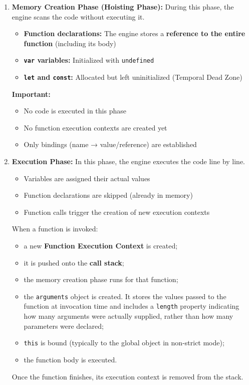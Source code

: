 \documentclass{scrbook}
\begin{document}
\begin{enumerate}
    \item
    \textbf{Memory Creation Phase (Hoisting Phase):}  
    During this phase, the engine scans the code without executing it.

    \begin{itemize}
        \item \textbf{Function declarations:} The engine stores a \textbf{reference to the entire function} (including its body)
        \item \textbf{\texttt{var} variables:} Initialized with \texttt{undefined}
        \item \textbf{\texttt{let} and \texttt{const}:} Allocated but left uninitialized (Temporal Dead Zone)
    \end{itemize}

    \textbf{Important:}
    \begin{itemize}
        \item No code is executed in this phase
        \item No function execution contexts are created yet
        \item Only bindings (name → value/reference) are established
    \end{itemize}

    \item
    \textbf{Execution Phase:}  
    In this phase, the engine executes the code line by line.

    \begin{itemize}
        \item Variables are assigned their actual values
        \item Function declarations are skipped (already in memory)
        \item Function calls trigger the creation of new execution contexts
    \end{itemize}

    When a function is invoked:
    \begin{itemize}
        \item a new \textbf{Function Execution Context} is created;
        \item it is pushed onto the \textbf{call stack};
        \item the memory creation phase runs for that function;
        \item the \texttt{arguments} object is created. It stores the values passed to the function at invocation time and includes a \texttt{length} property indicating how many arguments were actually supplied, rather than how many parameters were declared;
        \item \texttt{this} is bound (typically to the global object in non-strict mode);
        \item the function body is executed.
    \end{itemize}

    Once the function finishes, its execution context is removed from the stack.
\end{enumerate}
\end{document}
